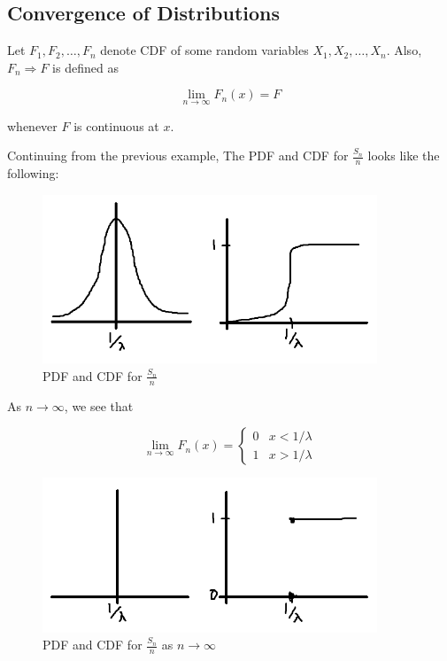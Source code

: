 \subsection{Convergence of Distributions}

Let $F_1, F_2, \dots, F_n$ denote CDF of some random variables $X_1, X_2, \dots, X_n$. Also, $F_n \Rightarrow F$ is defined as

\[\lim_{n\to\infty} F_n(x)=F\]

whenever $F$ is continuous at $x$.

\begin{texample}
	Continuing from the previous example, The PDF and CDF for $\frac{S_n}{n}$ looks like the following:
	
	\begin{figure}[H]
		\centering
		\includegraphics[width=100mm]{31.png}
		\caption{PDF and CDF for $\frac{S_n}{n}$}
	\end{figure}
	
	As $n\to\infty$, we see that
	
	\[\lim_{n\to\infty} F_n(x)=\begin{cases} 0 & x<1/\lambda \\ 1 & x>1/\lambda \end{cases}\]
	
	\begin{figure}[H]
		\centering
		\includegraphics[width=100mm]{32.png}
		\caption{PDF and CDF for $\frac{S_n}{n}$ as $n\to\infty$}
	\end{figure}
\end{texample}

